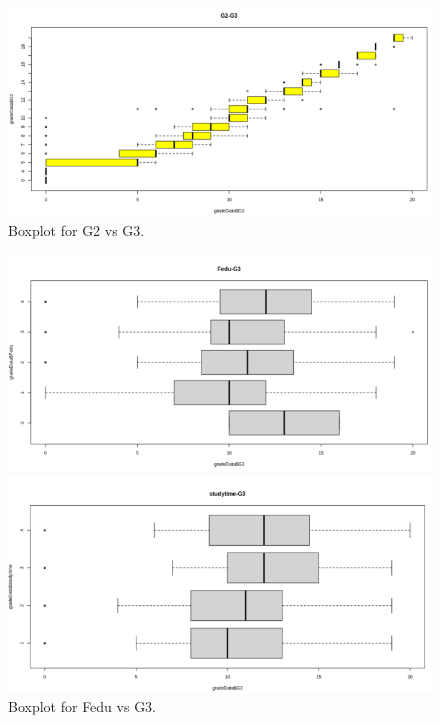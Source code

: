 \documentclass[a4paper]{article}
\begin{document}
\begin{enumerate}
\begin{figure}[H]
\begin{minipage}{0.5\textwidth}
        \end{minipage}%
        \begin{minipage}{0.5\textwidth}
            \centering
            \includegraphics[width = 1\linewidth]{Images/25.PNG}
            \caption{Boxplot for G2 vs G3.}
            \label{fig:boxplot3}
        \end{minipage}
    \end{figure}
    \begin{figure}[H]
        \centering
        \begin{minipage}{0.5\textwidth}
            \centering
            \includegraphics[width = 1\linewidth]{Images/23.PNG}
            \caption{Boxplot for Fedu vs G3.}
            \label{fig:boxplot4}
        \end{minipage}%
        \begin{minipage}{0.5\textwidth}
            \centering
            \includegraphics[width = 1\linewidth]{Images/24.PNG}

\end{minipage}
\end{figure}
\end{enumerate}
\end{document}
